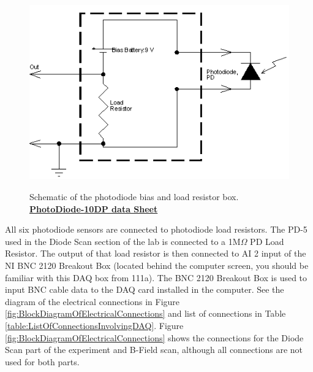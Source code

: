 \documentclass{../lab}
\begin{document}
\begin{figure}[h]
    \centering
    \href{http://experimentationlab.berkeley.edu/sites/default/files/images/MNOimage023.gif}{\includegraphics[width=0.6\linewidth]{images/MNOimage023.png}}
    \caption{Schematic of the photodiode bias and load resistor box. \href{http://experimentationlab.berkeley.edu/sites/default/files/images/PhotoDiode-10DP.pdf}{\textbf{PhotoDiode-10DP data Sheet}}}
    \label{fig:SchematicOfPhotodiodeBiasAndLoadResistorBox}
\end{figure}

All six photodiode sensors are connected to photodiode load resistors. The PD-5 used in the Diode Scan section of the lab is connected to a 1M$\Omega$ PD Load Resistor. The output of that load resistor is then connected to AI 2 input of the NI BNC 2120 Breakout Box (located behind the computer screen, you should be familiar with this DAQ box from 111a). The BNC 2120 Breakout Box is used to input BNC cable data to the DAQ card installed in the computer. See the diagram of the electrical connections in Figure \ref{fig:BlockDiagramOfElectricalConnections} and list of connections in Table \ref{table:ListOfConnectionsInvolvingDAQ}. Figure \ref{fig:BlockDiagramOfElectricalConnections} shows the connections for the Diode Scan part of the experiment and B-Field scan, although all connections are not used for both parts.
\end{document}
